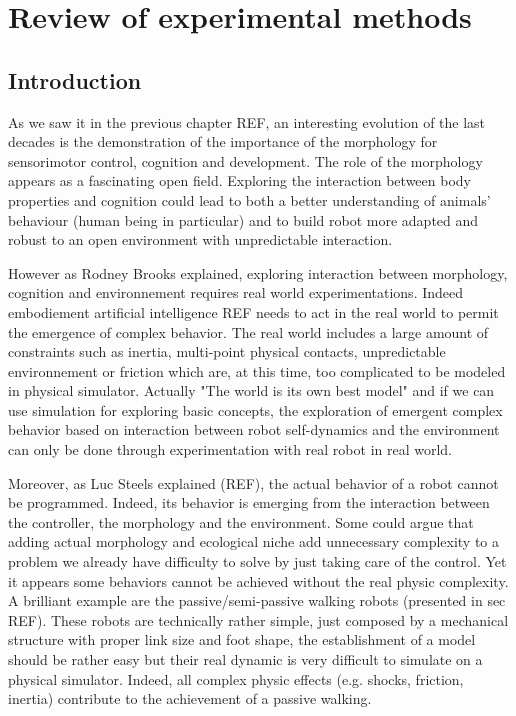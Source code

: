 
\cleartoleftpage

\chapter{Review of experimental methods} %
\label{cha:experimental-methods}


\section{Introduction} %

As we saw it in the previous chapter REF, an interesting evolution of the last decades is the demonstration of the importance of the morphology for sensorimotor control, cognition and development. The role of the morphology appears as a fascinating open field. Exploring the interaction between body properties and cognition could lead to both a better understanding of animals’ behaviour (human being in particular) and to build robot more adapted and robust to an open environment with unpredictable interaction.


However as Rodney Brooks explained, exploring interaction between morphology, cognition and environnement requires real world experimentations. Indeed embodiement artificial intelligence REF needs to act in the real world to permit the emergence of complex behavior. The real world includes a large amount of constraints such as inertia, multi-point physical contacts, unpredictable environnement or friction which are, at this time, too complicated to be modeled in physical simulator. Actually "The world is its own best model" and if we can use simulation for exploring basic concepts, the exploration of emergent complex behavior based on interaction between robot self-dynamics and the environment can only be done through experimentation with real robot in real world.

Moreover, as Luc Steels explained (REF), the actual behavior of a robot cannot be programmed. Indeed, its behavior is emerging from the interaction between the controller, the morphology and the environment. Some could argue that adding actual morphology and ecological niche add unnecessary complexity to a problem we already have difficulty to solve by just taking care of the control. Yet it appears some behaviors cannot be achieved without the real physic complexity. A brilliant example are the passive/semi-passive walking robots (presented in sec REF). These robots are technically rather simple, just composed by a mechanical structure with proper link size and foot shape, the establishment of a model should be rather easy but their real dynamic is very difficult to simulate on a physical simulator. Indeed, all complex physic effects (e.g. shocks, friction, inertia) contribute to the achievement of a passive walking.


